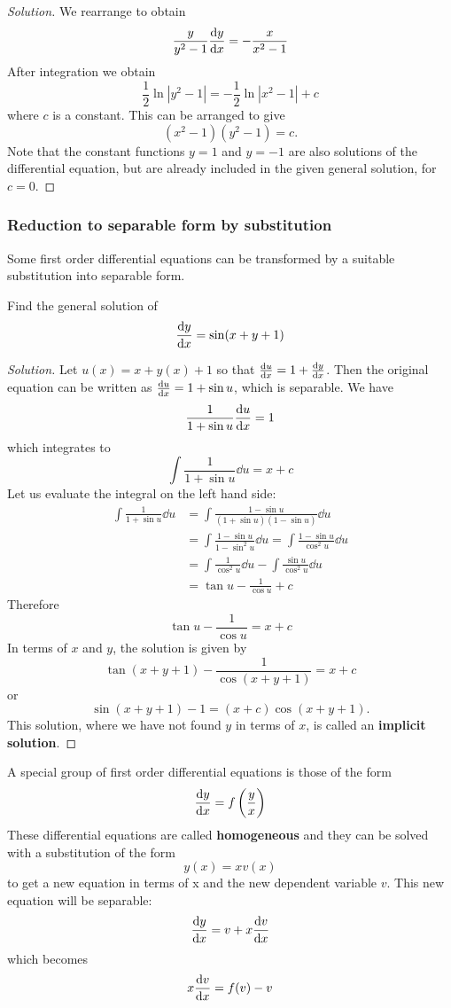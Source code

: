 \begin{proof}[Solution]
We rearrange to obtain
\[ \frac{y}{y^2-1}\dv{y}{x} = -\frac{x}{x^2-1} \]
After integration we obtain
\[ \frac{1}{2}\ln|y^2-1| = -\frac{1}{2}\ln|x^2-1| + c \]
where $c$ is a constant. This can be arranged to give
\[ (x^2-1)(y^2-1) = c. \]
Note that the constant functions $y=1$ and $y=-1$ are also solutions of the differential equation, but are already included in the given general solution, for $c=0$.
\end{proof}

\subsubsection{Reduction to separable form by substitution}
Some first order differential equations can be transformed by a suitable substitution into separable form.

\begin{exmp}{}{}
Find the general solution of
\[ \dv{y}{x} = \sin(x+y+1) \]
\end{exmp}

\begin{proof}[Solution]
Let $u(x) = x + y(x) + 1$ so that $\dv{u}{x} = 1 + \dv{y}{x}$. Then the original equation can be written as $\dv{u}{x} = 1 + \sin u$, which is separable. We have
\[ \frac{1}{1+\sin u}\dv{u}{x} = 1 \]
which integrates to
\[ \int \frac{1}{1+\sin u} \dd{u} = x+c \]
Let us evaluate the integral on the left hand side:
\begin{align*}
\int \frac{1}{1+\sin u} \dd{u}
&= \int \frac{1-\sin u}{(1+\sin u)(1-\sin u)} \dd{u} \\
&= \int \frac{1-\sin u}{1-\sin^2u} \dd{u} = \int \frac{1-\sin u}{\cos^2u} \dd{u} \\
&= \int \frac{1}{\cos^2u} \dd{u} - \int \frac{\sin u}{\cos^2u} \dd{u} \\
&= \tan u - \frac{1}{\cos u} + c
\end{align*}
Therefore 
\[ \tan u - \frac{1}{\cos u} = x+c \]
In terms of $x$ and $y$, the solution is given by
\[ \tan (x+y+1) - \frac{1}{\cos (x+y+1)} = x+c \]
or
\[ \sin (x+y+1) - 1 = (x+c) \cos (x+y+1). \]
This solution, where we have not found $y$ in terms of $x$, is called an \textbf{implicit solution}.
\end{proof}

A special group of first order differential equations is those of the form
\[ \dv{y}{x} = f\left(\frac{y}{x}\right) \]
These differential equations are called \textbf{homogeneous} and they can be solved with a substitution
of the form
\[ y(x) = xv(x) \]
to get a new equation in terms of x and the new dependent variable $v$. This new equation will be
separable:
\[ \dv{y}{x} = v + x\dv{v}{x} \]
which becomes
\[ x\dv{v}{x} = f(v) - v \]

